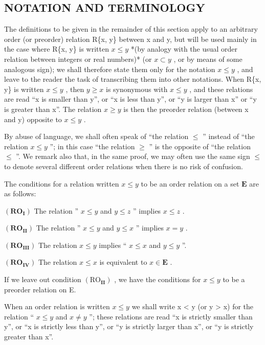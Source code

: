 \subsection{NOTATION AND TERMINOLOGY}

The definitions to be given in the remainder of this section apply to an arbitrary order (or preorder) relation R\{x, y\} between x and y, but will be used mainly in the case where R\{x, y\} is written \(x \leqslant y\) *(by analogy with the usual order relation between integers or real numbers)* (or \(x \subset y\) , or by means of some analogous sign); we shall therefore state them only for the notation \(x \leqslant y\) , and leave to the reader the task of transcribing them into other notations. When R\{x, y\} is written \(x \leqslant y\) , then \(y \geqslant x\) is synonymous with \(x \leqslant y\) , and these relations are read ``x is smaller than y'', or ``x is less than y'', or ``y is larger than x'' or ``y is greater than x''. The relation \(x \geqslant y\) is then the preorder relation (between x and y) opposite to \(x \leqslant y\) .

By abuse of language, we shall often speak of ``the relation \(\leqslant\) '' instead of ``the relation \(x \leqslant y\) ''; in this case ``the relation \(\geqslant\) '' is the opposite of ``the relation \(\leqslant\) ''. We remark also that, in the same proof, we may often use the same sign \(\leqslant\) to denote several different order relations when there is no risk of confusion.

The conditions for a relation written \(x \leqslant y\) to be an order relation on a set \(\mathbf{E}\) are as follows:

\((\mathbf{RO}_{\mathbf{I}})\) The relation '' \(x \leqslant y\) and \(y \leqslant z\) '' implies \(x \leqslant z\) .

\((\mathbf{RO}_{\mathbf{II}})\) The relation '' \(x \leqslant y\) and \(y \leqslant x\) '' implies \(x = y\) .

\((\mathbf{RO}_{\mathbf{III}})\) The relation \(x \leqslant y\) implies `` \(x \leqslant x\) and \(y \leqslant y\) ''.

\((\mathbf{RO}_{\mathbf{IV}})\) The relation \(x \leqslant x\) is equivalent to \(x \in \mathbf{E}\) .

If we leave out condition \((\mathrm{RO}_{\mathbf{II}})\) , we have the conditions for \(x \leqslant y\) to be a preorder relation on E.

When an order relation is written \(x \leqslant y\) we shall write x \textless{} y (or y \textgreater{} x) for the relation `` \(x \leqslant y\) and \(x \neq y\) ''; these relations are read ``x is strictly smaller than y'', or ``x is strictly less than y'', or ``y is strictly larger than x'', or ``y is strictly greater than x''.

